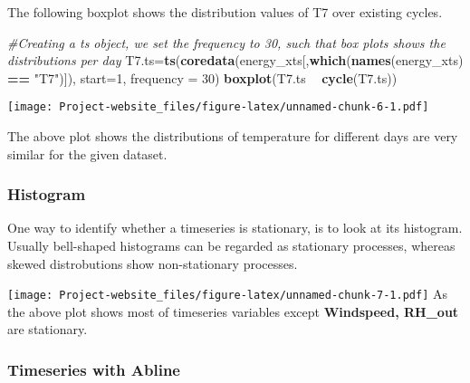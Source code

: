 \documentclass[]{article}
\newenvironment{Shaded}{\begin{snugshade}}{\end{snugshade}}
\newcommand{\KeywordTok}[1]{\textcolor[rgb]{0.13,0.29,0.53}{\textbf{#1}}}
\newcommand{\DataTypeTok}[1]{\textcolor[rgb]{0.13,0.29,0.53}{#1}}
\newcommand{\DecValTok}[1]{\textcolor[rgb]{0.00,0.00,0.81}{#1}}
\newcommand{\StringTok}[1]{\textcolor[rgb]{0.31,0.60,0.02}{#1}}
\newcommand{\CommentTok}[1]{\textcolor[rgb]{0.56,0.35,0.01}{\textit{#1}}}
\newcommand{\OperatorTok}[1]{\textcolor[rgb]{0.81,0.36,0.00}{\textbf{#1}}}
\newcommand{\NormalTok}[1]{#1}
\begin{document}
The following boxplot shows the distribution values of T7 over existing
cycles.

\begin{Shaded}
\begin{Highlighting}[]
\CommentTok{#Creating a ts object, we set the frequency to 30, such that box plots shows the distributions per day}
\NormalTok{T7.ts=}\KeywordTok{ts}\NormalTok{(}\KeywordTok{coredata}\NormalTok{(energy_xts[,}\KeywordTok{which}\NormalTok{(}\KeywordTok{names}\NormalTok{(energy_xts) }\OperatorTok{==}\StringTok{ "T7"}\NormalTok{)]), }\DataTypeTok{start=}\DecValTok{1}\NormalTok{, }\DataTypeTok{frequency =} \DecValTok{30}\NormalTok{)}
\KeywordTok{boxplot}\NormalTok{(T7.ts }\OperatorTok{~}\StringTok{ }\KeywordTok{cycle}\NormalTok{(T7.ts))}
\end{Highlighting}
\end{Shaded}

\texttt{[image: Project-website\_files/figure-latex/unnamed-chunk-6-1.pdf]}

The above plot shows the distributions of temperature for different days
are very similar for the given dataset.

\subsubsection{Histogram}\label{histogram}

One way to identify whether a timeseries is stationary, is to look at
its histogram. Usually bell-shaped histograms can be regarded as
stationary processes, whereas skewed distrobutions show non-stationary
processes.

\begin{Shaded}
\end{Shaded}

\texttt{[image: Project-website\_files/figure-latex/unnamed-chunk-7-1.pdf]}
As the above plot shows most of timeseries variables except
\textbf{Windspeed, RH\_out} are stationary.

\subsubsection{Timeseries with Abline}\label{timeseries-with-abline}
\end{document}
